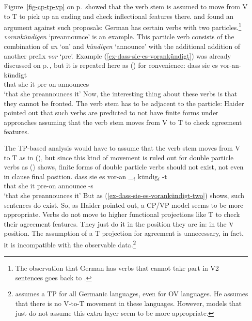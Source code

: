 \largerpage
Figure~\ref{fig-cp-tp-vp} on p.\,\pageref{fig-cp-tp-vp} showed that the verb stem is assumed to move from V to T to
pick up an ending and check inflectional features there. \textcites[]{Haider93a}[--60]{Haider2010a} and \citet[Section~3.3]{Vikner2001a} found an
argument against such proposals: German has certain verbs with two particles.\footnote{%
  The observation that German has verbs that cannot take part in V2 sentences goes back to
  \citet{Hoehle91b}.
} 
\emph{vorankündigen} `preannounce'
is an example. This particle verb consists of the combination of \emph{an} `on' and \emph{kündigen} `announce' with
the additional addition of another prefix \emph{vor} `pre'. Example
(\ref{ex-dass-sie-es-vorankündigt}) was already discussed on
p.\,\pageref{ex-dass-sie-es-vorankündigt}, but it is repeated here as () for convenience:
\ea 
\label{ex-dass-sie-es-vorankündigt-two}
\gll dass sie es vor-an-kündigt\\
     that she it pre-on-announces\\
\glt `that she preannounces it'
\z
Now, the interesting thing about these verbs is that they cannot be fronted. The verb stem has to be
adjacent to the particle:
\eal
{}
\zl
Haider pointed out that such verbs are predicted to not have finite forms under approaches assuming
that the verb stem moves from V to T to check agreement features.

The TP-based analysis would have to assume that the verb stem  moves from V to T as in (), but
since this kind of movement is ruled out for double particle verbs as () shows, finite forms
of double particle verbs should not exist, not even in clause final position.
\ea 
\gll dass sie es vor-an \_$_i$ kündig$_i$ -t\\
     that she it pre-on {}    announce -s\\
\glt `that she preannounces it'
\z
But as (\ref{ex-dass-sie-es-vorankündigt-two}) shows, such sentences do exist. So, as Haider pointed
out, a CP/VP model seems to be more appropriate. Verbs do not move to higher functional projections
like T to check their agreement features. They just do it in the position they are in: in the V position. The
assumption of a T projection for agreement is unnecessary, in fact, it is incompatible with the
observable data.\footnote{%
  \citet{Vikner2001a} assumes a TP for all Germanic languages, even for OV languages. He assumes
  that there is no V-to-T movement in these languages. However, models that just do not assume this
  extra layer seem to be more appropriate.
}

